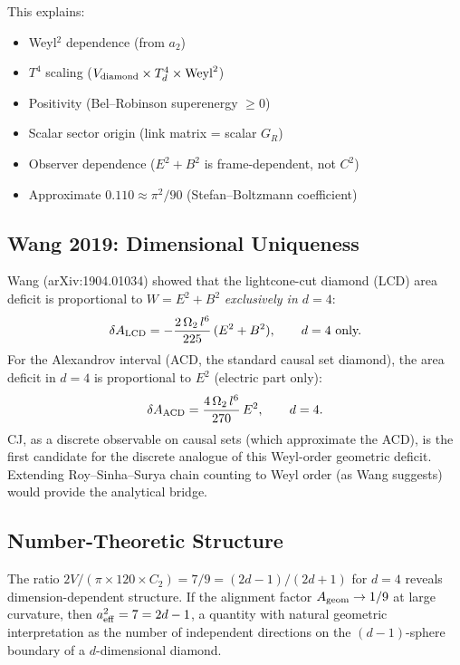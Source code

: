 \documentclass[11pt,a4paper]{article}
\begin{document}
This explains:
\begin{itemize}
\item Weyl$^2$ dependence (from $a_2$)
\item $T^4$ scaling ($V_{\rm diamond} \times T_d^4 \times \text{Weyl}^2$)
\item Positivity (Bel--Robinson superenergy $\geq 0$)
\item Scalar sector origin (link matrix = scalar $G_R$)
\item Observer dependence ($E^2+B^2$ is frame-dependent, not $C^2$)
\item Approximate $0.110 \approx \pi^2/90$ (Stefan--Boltzmann coefficient)
\end{itemize}

\subsection{Wang 2019: Dimensional Uniqueness}

Wang (arXiv:1904.01034) showed that the lightcone-cut diamond (LCD) area deficit is proportional to $W = E^2+B^2$ \emph{exclusively in $d=4$}:
\begin{equation}
\delta A_{\rm LCD} = -\frac{2\,\Omega_2\,l^6}{225}\,(E^2+B^2), \qquad d=4 \text{ only.}
\end{equation}
For the Alexandrov interval (ACD, the standard causal set diamond), the area deficit in $d=4$ is proportional to $E^2$ (electric part only):
\begin{equation}
\delta A_{\rm ACD} = \frac{4\,\Omega_2\,l^6}{270}\,E^2, \qquad d=4.
\end{equation}
CJ, as a discrete observable on causal sets (which approximate the ACD), is the first candidate for the discrete analogue of this Weyl-order geometric deficit. Extending Roy--Sinha--Surya chain counting to Weyl order (as Wang suggests) would provide the analytical bridge.

\subsection{Number-Theoretic Structure}

The ratio $2V/(\pi \times 120 \times C_2) = 7/9 = (2d-1)/(2d+1)$ for $d=4$ reveals dimension-dependent structure. If the alignment factor $A_{\rm geom} \to 1/9$ at large curvature, then $a_{\rm eff}^2 = 7 = 2d-1$, a quantity with natural geometric interpretation as the number of independent directions on the $(d{-}1)$-sphere boundary of a $d$-dimensional diamond.
\end{document}
